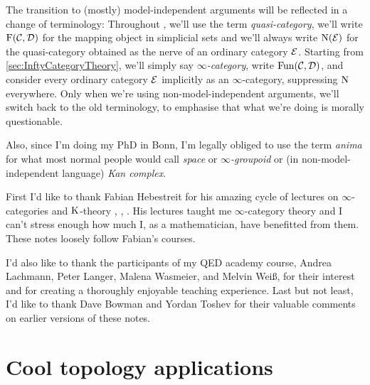 \documentclass[DIV=12,numbers=enddot,leqno,bibliography=totoc]{scrartcl}
\begin{document}
\begin{numpar}
		The transition to (mostly) model-independent arguments will be reflected in a change of terminology: Throughout , we'll use the term  \emph{quasi-category}, we'll write $\operatorname{F}(\mathcal{C},\mathcal{D})$ for the mapping object in simplicial sets and we'll always write $\operatorname{N}(\mathcal{E})$ for the quasi-category obtained as the nerve of an ordinary category $\mathcal{E}$. Starting from \cref{sec:InftyCategoryTheory}, we'll simply say \emph{$\infty$-category}, write $\operatorname{Fun}(\mathcal{C},\mathcal{D})$, and consider every ordinary category $\mathcal{E}$ implicitly as an $\infty$-category, suppressing $\operatorname{N}$ everywhere. Only when we're using non-model-independent arguments, we'll switch back to the old terminology, to emphasise that what we're doing is morally questionable.
		
		Also, since I'm doing my PhD in Bonn, I'm legally obliged to use the term \emph{anima} for what most normal people would call \emph{space} or \emph{$\infty$-groupoid} or (in non-model-independent language) \emph{Kan complex}.
	\end{numpar}
	\begin{numpar}[Acknowledgments.]
		First I'd like to thank Fabian Hebestreit for his amazing cycle of lectures on $\infty$-categories and $\operatorname{K}$-theory \cite{HigherCatsI}, \cite{HigherCatsII}, \cite{KTheory}. His lectures taught me $\infty$-category theory and I can't stress enough how much I, as a mathematician, have benefitted from them. These notes loosely follow Fabian's courses.
		
		I'd also like to thank the participants of my QED academy course, Andrea Lachmann, Peter Langer, Malena Wasmeier, and Melvin Weiß, for their interest and for creating a thoroughly enjoyable teaching experience. Last but not least, I'd like to thank Dave Bowman and Yordan Toshev for their valuable comments on earlier versions of these notes.
	\end{numpar}
	
	\newpage
	
	
	
	
	
	
	\newpage
	\section[Cool topology applications]{Cool topology applications \coolemoji}\label{sec:CoolTopologyApplications}
	
	

	\newpage
	\renewcommand{\ParagraphOrNot}{}
	
	\renewcommand{\bibfont}{\small}
	
	\printbibliography
\end{document}
